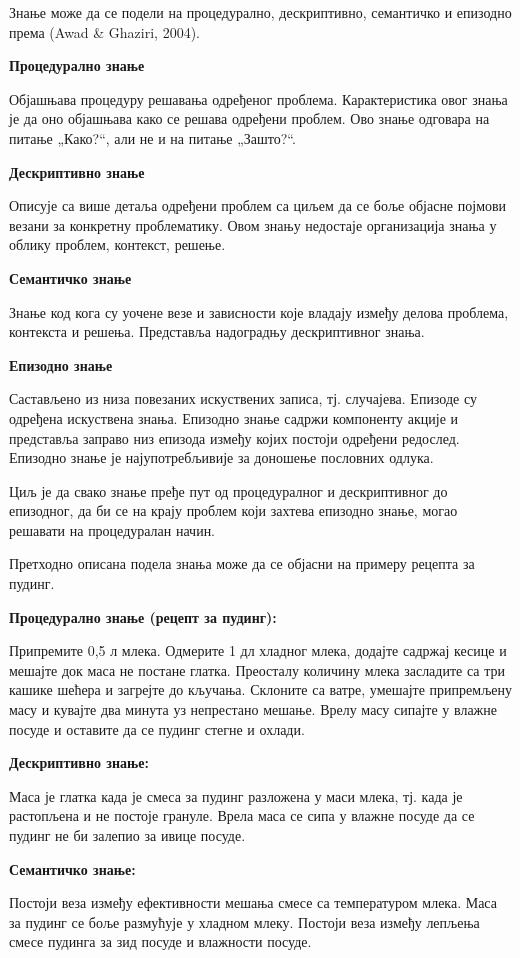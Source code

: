 Знање може да се подели на процедурално, дескриптивно, семантичко и епизодно према (Awad \& Ghaziri, 2004).

\textbf{Процедурално знање}

Објашњава процедуру решавања одређеног проблема. Карактеристика овог знања је да оно објашњава како се решава одређени проблем. Ово знање одговара на питање „Како?“, али не и на питање „Зашто?“.

\textbf{Дескриптивно знање}

Описује са више детаља одређени проблем са циљем да се боље објасне појмови везани за конкретну проблематику. Овом знању недостаје организација знања у облику проблем, контекст, решење.

\textbf{Семантичко знање}

Знање код кога су уочене везе и зависности које владају између делова проблема, контекста и решења. Представља надоградњу дескриптивног знања.

\textbf{Епизодно знање}

Састављено из низа повезаних искуствених записа, тј. случајева. Епизоде су одређена искуствена знања. Епизодно знање садржи компоненту акције и представља заправо низ епизода између којих постоји одређени редослед. Епизодно знање је најупотребљивије за доношење пословних одлука.

Циљ је да свако знање пређе пут од процедуралног и дескриптивног до епизодног, да би се на крају проблем који захтева епизодно знање, могао решавати на процедуралан начин.

Претходно описана подела знања може да се објасни на примеру рецепта за пудинг.

\textbf{Процедурално знање (рецепт за пудинг):}

Припремите 0,5 л млека. Одмерите 1 дл хладног млека, додајте садржај кесице и мешајте док маса не постане глатка. Преосталу количину млека засладите са три кашике шећера и загрејте до кључања. Склоните са ватре, умешајте припремљену масу и кувајте два минута уз непрестано мешање. Врелу масу сипајте у влажне посуде и оставите да се пудинг стегне и охлади.

\textbf{Дескриптивно знање:}

Маса је глатка када је смеса за пудинг разложена у маси млека, тј. када је растопљена и не постоје грануле. Врела маса се сипа у влажне посуде да се пудинг не би залепио за ивице посуде.

\textbf{Семантичко знање:}

Постоји веза између ефективности мешања смесе са температуром млека. Маса за пудинг се боље размућује у хладном млеку. Постоји веза између лепљења смесе пудинга за зид посуде и влажности посуде.

